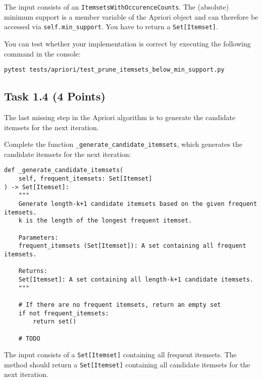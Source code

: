 \documentclass[
english,
smallborders
]{i6prcsht}
\newcommand{\points}[1]{\hfill \color{red}(#1 Points)\color{black}}
\begin{document}
\vspace*{0.1cm}

The input consists of an \texttt{ItemsetsWithOccurenceCounts}. The (absolute) minimum support is a member variable of the Apriori object and can therefore be accessed via \texttt{self.min\_support}. You have to return a \texttt{Set[Itemset]}.

You can test whether your implementation is correct by executing the following command in the console:

\vspace*{0.3cm}

\begin{lstlisting}
pytest tests/apriori/test_prune_itemsets_below_min_support.py
\end{lstlisting}

\vspace*{0.1cm}

\subsection*{Task 1.4 \points{4}}

The last missing step in the Apriori algorithm is to generate the candidate itemsets for the next iteration.

Complete the function \texttt{\_generate\_candidate\_itemsets}, which generates the candidate itemsets for the next iteration:

\vspace*{0.3cm}

\begin{lstlisting}
def _generate_candidate_itemsets(
    self, frequent_itemsets: Set[Itemset]
) -> Set[Itemset]:
	"""
	Generate length-k+1 candidate itemsets based on the given frequent itemsets.
	k is the length of the longest frequent itemset.

	Parameters:
	frequent_itemsets (Set[Itemset]): A set containing all frequent itemsets.

	Returns:
	Set[Itemset]: A set containing all length-k+1 candidate itemsets.
	"""

	# If there are no frequent itemsets, return an empty set
	if not frequent_itemsets:
		return set()

	# TODO
\end{lstlisting}

\vspace*{0.1cm}

The input consists of a \texttt{Set[Itemset]} containing all frequent itemsets. The method should return a \texttt{Set[Itemset]} containing all candidate itemsets for the next iteration.
\end{document}
